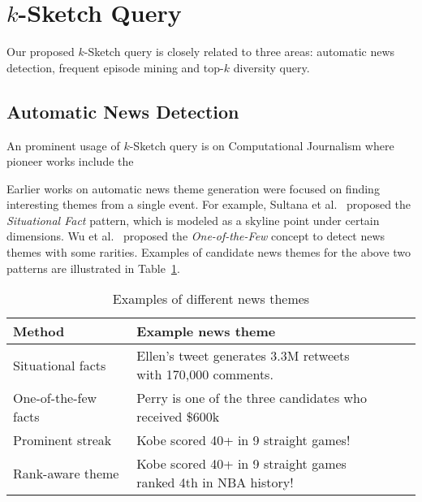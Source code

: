 \section{$k$-Sketch Query}\label{sec:related_work}
Our proposed $k$-Sketch query is closely related
to three areas: automatic news detection, frequent episode mining and top-$k$ diversity query.

\subsection{Automatic News Detection}
An prominent usage of $k$-Sketch query is on Computational
Journalism where pioneer works include the 

Earlier works on automatic news theme generation were focused on finding interesting themes from a single event. For example, Sultana et al.~\cite{sultana2014incremental} proposed the \emph{Situational Fact} pattern, which is modeled as a skyline point under certain dimensions. Wu et al.~\cite{wu2012one} proposed the \emph{One-of-the-Few} concept to detect news themes with some rarities. Examples of candidate news themes for the above two patterns are illustrated in Table~\ref{tbl:related_works}.

{\renewcommand{\arraystretch}{1.2} 
\begin{table}[h]
\centering
\begin{tabular}{|l|l|}
\hline
\textbf{Method} & \textbf{Example news theme}\\
\hline
Situational facts~\cite{sultana2014incremental} & \pbox{22cm}{\vspace{.3\baselineskip} Ellen's tweet generates 3.3M retweets\\ with 170,000 comments.\vspace{.3\baselineskip}} \\
\hline
One-of-the-few facts~\cite{wu2012one} & \pbox{22cm}{\vspace{.3\baselineskip}Perry is one of the three candidates \\  who received \$600k\vspace{.3\baselineskip}} \\
\hline
Prominent streak~\cite{zhang2014discovering} & Kobe scored 40+ in 9 straight games!  \\
\hline
Rank-aware theme & \pbox{22cm}{\vspace{.3\baselineskip}Kobe scored 40+ in 9 straight games\\ ranked 4th in NBA history!\vspace{.3\baselineskip}} \\
\hline
\end{tabular}
\caption{Examples of different news themes}
\label{tbl:related_works}
\end{table}
}

